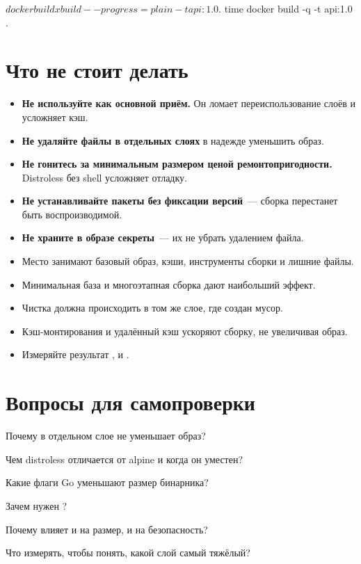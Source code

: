 \begin{code}[language=bash]
$ docker buildx build --progress=plain -t api:1.0 .
$ time docker build -q -t api:1.0 .
\end{code}

\section{Что не стоит делать}

\begin{itemize}
  \item \textbf{Не используйте  как основной приём.}
        Он ломает переиспользование слоёв и усложняет кэш.
  \item \textbf{Не удаляйте файлы в отдельных слоях} в надежде уменьшить
        образ.
  \item \textbf{Не гонитесь за минимальным размером ценой ремонтопригодности.}
        Distroless без shell усложняет отладку.
  \item \textbf{Не устанавливайте пакеты без фиксации версий}~---
        сборка перестанет быть воспроизводимой.
  \item \textbf{Не храните в образе секреты}~--- их не убрать удалением
        файла.
\end{itemize}

\begin{summarybox}
\begin{itemize}
  \item Место занимают базовый образ, кэши, инструменты сборки
        и лишние файлы.
  \item Минимальная база и многоэтапная сборка дают наибольший эффект.
  \item Чистка должна происходить в том же слое, где создан мусор.
  \item Кэш-монтирования и удалённый кэш ускоряют сборку, не увеличивая
        образ.
  \item Измеряйте результат , 
        и .
\end{itemize}
\end{summarybox}

\section*{Вопросы для самопроверки}
\begin{selfcheck}
  \item Почему  в отдельном слое не уменьшает образ?
  \item Чем distroless отличается от alpine и когда он уместен?
  \item Какие флаги Go уменьшают размер бинарника?
  \item Зачем нужен ?
  \item Почему  влияет и на размер, и на безопасность?
  \item Что измерять, чтобы понять, какой слой самый тяжёлый?
\end{selfcheck}
